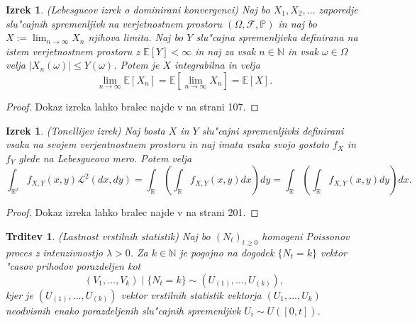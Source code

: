\documentclass[12pt, a4paper, reqno]{amsart}
\theoremstyle{definition}
\theoremstyle{plain}
\newtheorem{izrek}[definicija]{Izrek}
\newtheorem{trditev}[definicija]{Trditev}
\newcommand{\R}{\mathbb{R}}
\newcommand{\N}{\mathbb{N}}
\newcommand{\E}{\mathbb{E}}
\newcommand{\Prob}{\mathbb{P}}
\newcommand{\1}{\mathds{1}}
\begin{document}
    \begin{izrek}(Lebesgueov izrek o dominirani konvergenci)
        Naj bo $X_1, X_2, \dots $ zaporedje slu"cajnih spremenljivk na verjetnostnem prostoru
        $(\Omega, \mathcal{F}, \Prob)$ in naj bo $X:= \lim_{n\to\infty}X_n$ njihova limita.
        Naj bo $Y$ slu"cajna spremenljivka definirana na istem verjetnostnem prostoru z $\E\left[Y\right]<\infty$ in
        naj za vsak $n\in\N$ in vsak $\omega\in\Omega$ velja $|X_n(\omega)| \leq Y(\omega)$. Potem je $X$ integrabilna
        in velja 
        \begin{equation*}
            \lim_{n\to\infty}\E\left[X_n\right] = \E\left[\lim_{n\to\infty}X_n\right] = \E\left[X\right].
        \end{equation*}
        \label{izr:dominiranaKonvergenca}
    \end{izrek}

    \begin{proof}
        Dokaz izreka lahko bralec najde v \cite{7} na strani 107.
    \end{proof}

    \begin{izrek}(Tonellijev izrek)
        Naj bosta $X$ in $Y$ slu"cajni spremenljivki definirani vsaka na svojem verjentnostnem prostoru
        in naj imata vsaka svojo gostoto $f_X$ in $f_Y$ glede na Lebesgueovo mero.
        Potem velja
        \begin{equation*}
            \int_{\R^2}f_{X, Y}(x, y)\mathcal{L}^2(dx, dy) 
            = \int_{\R}\left(\int_{\R}f_{X, Y}(x, y)dx\right)dy = \int_{\R}\left(\int_{\R}f_{X, Y}(x, y)dy\right)dx.
        \end{equation*}
        \label{izr:TonellijevIzrek}
    \end{izrek}

    \begin{proof}
        Dokaz izreka lahko bralec najde v \cite{12} na strani 201.
    \end{proof} 

    \begin{trditev}(Lastnost vrstilnih statistik)
        Naj bo $(N_t)_{t\geq0}$ homogeni Poissonov proces z intenzivnostjo $\lambda > 0$. 
        Za $k\in\N$ je pogojno na dogodek $\{N_t = k\}$ vektor "casov prihodov porazdeljen kot 
        \begin{equation*}
            (V_1, \dots, V_k) \mid \{N_t = k\} \sim (U_{(1)}, \dots, U_{(k)}),
        \end{equation*}
        kjer je $(U_{(1)}, \dots, U_{(k)})$ vektor vrstilnih statistik vektorja $(U_1, \dots, U_k)$ 
        neodvisnih \newline enako porazdeljenih slu"cajnih spremenljivk $U_i\sim U\left([0, t]\right)$.
        \label{trd:VrstilneStatistikeHPP}
    \end{trditev}
\end{document}
